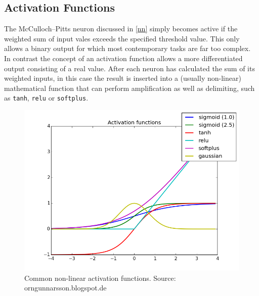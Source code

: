 

\subsection{Activation Functions}
\label{activation}

The McCulloch–Pitts neuron discussed in \ref{nn} simply becomes active if the weighted sum of input vales exceeds the specified threshold value. This only allows a binary output for which most contemporary tasks are far too complex. In contrast the concept of an activation function allows a more differentiated output consisting of a real value. After each neuron has calculated the sum of its weighted inputs, in this case the result is inserted into a (usually non-linear) mathematical function that can perform amplification as well as delimiting, such as \texttt{tanh}, \texttt{relu} or \texttt{softplus}.


\begin{figure}[h]
    \centering
	\includegraphics[width=.9\textwidth]{./images/illustrations/ActivationFunctions}
    \caption{Common non-linear activation functions. Source: orngunnarsson.blogspot.de}
    \label{fig:actviation}
\end{figure}

